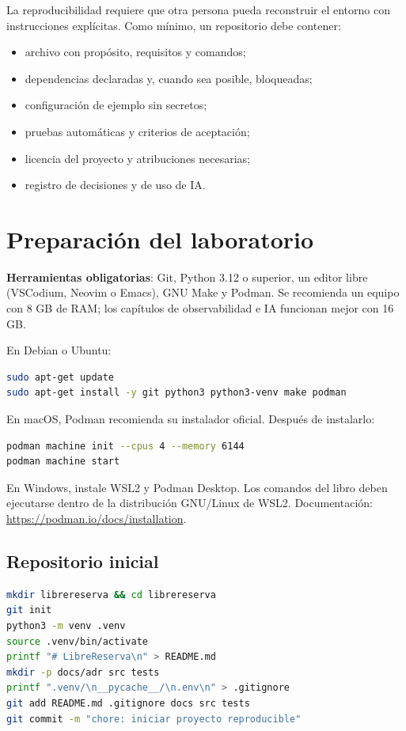 La reproducibilidad requiere que otra persona pueda reconstruir el entorno con instrucciones explícitas. Como mínimo, un repositorio debe contener:
\begin{itemize}
  \item archivo  con propósito, requisitos y comandos;
  \item dependencias declaradas y, cuando sea posible, bloqueadas;
  \item configuración de ejemplo sin secretos;
  \item pruebas automáticas y criterios de aceptación;
  \item licencia del proyecto y atribuciones necesarias;
  \item registro de decisiones y de uso de IA.
\end{itemize}

\section{Preparación del laboratorio}
\begin{instalacion}
\textbf{Herramientas obligatorias}: Git, Python 3.12 o superior, un editor libre (VSCodium, Neovim o Emacs), GNU Make y Podman. Se recomienda un equipo con 8 GB de RAM; los capítulos de observabilidad e IA funcionan mejor con 16 GB.

En Debian o Ubuntu:
\begin{lstlisting}[language=bash]
sudo apt-get update
sudo apt-get install -y git python3 python3-venv make podman
\end{lstlisting}

En macOS, Podman recomienda su instalador oficial. Después de instalarlo:
\begin{lstlisting}[language=bash]
podman machine init --cpus 4 --memory 6144
podman machine start
\end{lstlisting}

En Windows, instale WSL2 y Podman Desktop. Los comandos del libro deben ejecutarse dentro de la distribución GNU/Linux de WSL2. Documentación: \url{https://podman.io/docs/installation}.
\end{instalacion}

\subsection{Repositorio inicial}
\begin{lstlisting}[language=bash]
mkdir librereserva && cd librereserva
git init
python3 -m venv .venv
source .venv/bin/activate
printf "# LibreReserva\n" > README.md
mkdir -p docs/adr src tests
printf ".venv/\n__pycache__/\n.env\n" > .gitignore
git add README.md .gitignore docs src tests
git commit -m "chore: iniciar proyecto reproducible"
\end{lstlisting}


